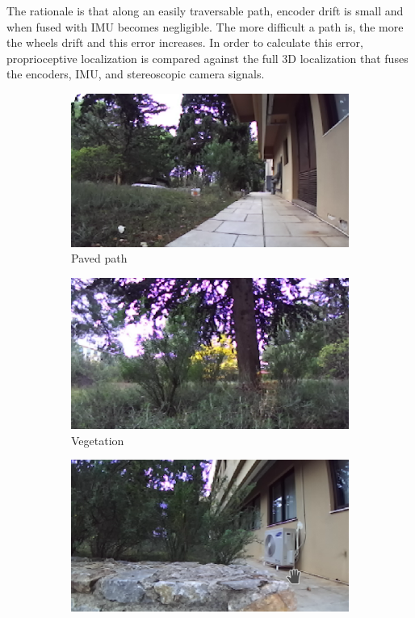 \documentclass[12pt,a4paper,table,dvipsnames,tikz]{report}
\newcommand{\acronym}{\MakeUppercase}
\begin{document}
	The rationale is that along an easily traversable path, encoder drift is small and 
	when fused with \acronym{imu} becomes negligible. The more difficult a path is, the 
	more the wheels drift and this error increases. In order to calculate this error, 
	proprioceptive localization is compared against the full \acronym{3d} localization that
	fuses the encoders, \acronym{imu}, and stereoscopic camera signals.
	\\
	
	\begin{figure}[h!]
		\caption{Indicative scenes for the localization error experiments.}
		\centering
		\begin{subfigure}[b]{0.3\textwidth}
			\includegraphics[width=\textwidth]{road}
			\caption{Paved path}
		\end{subfigure}
		\begin{subfigure}[b]{0.3\textwidth}
			\includegraphics[width=\textwidth]{grass}
			\caption{Vegetation}
		\end{subfigure}
		\begin{subfigure}[b]{0.3\textwidth}
			\includegraphics[width=\textwidth]{wall}

\end{subfigure}
\end{figure}
\end{document}
